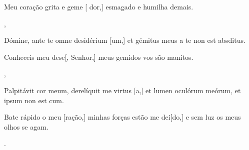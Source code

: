 {        {\item {}Meu coração grita e geme [ dor,] esmagado e humilha demais.~\Responsorium},
    {\item {}Dómine, ante te omne desidérium [um,] et gémitus meus a te non est absditus.~\Responsorium}%
        {\item {}Conheceis meu dese[, Senhor,] meus gemidos vos são manitos.~\Responsorium},
    {\item {}Palpitávit cor meum, derelíquit me virtus [a,] et lumen oculórum meórum, et ipsum non est \-cum.~\Responsorium}%
        {\item {}Bate rápido o meu [ração,] minhas forças estão me dei[do,] e sem luz os meus olhos se agam.~\Responsorium}.
}